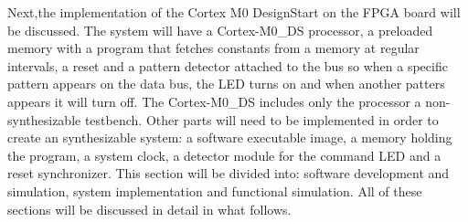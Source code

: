 Next,the implementation of the Cortex M0 DesignStart on the FPGA board will be discussed. The system will have a Cortex-M0\_DS processor, a preloaded memory with a program that fetches constants from a memory at regular intervals, a reset and a pattern detector attached to the bus so when a specific pattern appears on the data bus, the LED turns on and when another patters appears it will turn off. The Cortex-M0\_DS  includes only the processor a non-synthesizable testbench. Other parts will need to be implemented in order to create an synthesizable system: a software executable image, a memory holding the program, a system clock, a detector module for the command LED and a reset synchronizer. This section will be divided into: software development and simulation, system implementation and functional simulation. All of these sections will be discussed in detail in what follows.

